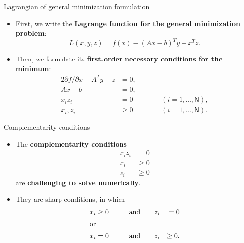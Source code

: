 %
\begin{frame}{Lagrangian of general minimization formulation}

\small
\begin{itemize}[<+->]
\item First, we write the {\bf Lagrange function for the general minimization problem}:
\[
L(x,y,z)=f(x)-(Ax-b)^{T}y-x^{T}z.
\]
\item Then, we formulate its \textbf{first-order necessary conditions for the minimum}:
%
\begin{alignat*}{2}
\partial f/\partial x-A^{T}y-z & =0, & \qquad\\
Ax-b & =0,\\
x_{i}z_{i} & =0 &  & (i=1,\ldots,\mathsf{N}),\\
x_{i},z_{i} & \geq0 &  & (i=1,\ldots,\mathsf{N}).
\end{alignat*}
%
\end{itemize}
\end{frame}
%
%
\begin{frame}{Complementarity conditions}

\begin{itemize}
\item The \alert{\bf complementarity conditions}
\begin{align*}
x_{i}z_{i} & =0\\
x_{i} & \geq0\\
z_{i} & \geq0
\end{align*}
 are {\bf challenging to solve numerically}.
\item They are sharp conditions, in which
\begin{alignat*}{3}
x_{i} & \geq0 & \qquad\text{and}\qquad & z_{i} & =0\\
\shortintertext{or}x_{i} & =0 & \qquad\text{and}\qquad & z_{i} & \geq0.
\end{alignat*}

\end{itemize}
\end{frame}
%
